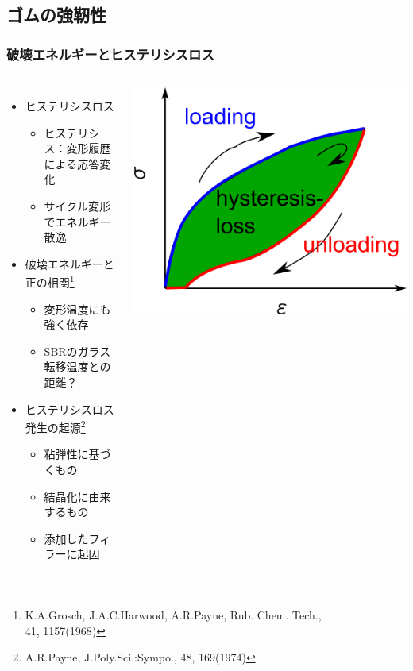 \documentclass[aspectratio=169,11pt, dvipdfmx]{beamer}
\begin{document}
\subsection{ゴムの強靭性}
\begin{frame}
	\frametitle{破壊エネルギーとヒステリシスロス}
	\vspace{-1mm}
			\begin{columns}[T, onlytextwidth]
					\begin{itemize}
						\item ヒステリシスロス
							\begin{itemize}
								\item ヒステリシス：変形履歴による応答変化
								\item サイクル変形でエネルギー散逸
							\end{itemize}
						\item 破壊エネルギーと\alert{正の相関}\footnote{
								\scriptsize{K.A.Grosch, J.A.C.Harwood, A.R.Payne, Rub. Chem. Tech., \\41, 1157(1968)}
							}
							\begin{itemize}
								\item \alert{変形温度}にも強く依存
								\item SBRのガラス転移温度との距離？
							\end{itemize}
						\item ヒステリシスロス発生の起源\footnote{
							\scriptsize{A.R.Payne, J.Poly.Sci.:Sympo., 48, 169(1974)}
						}
						\begin{itemize}
							\item \alert{粘弾性に基づくもの}
							\color{blue}
							\item 結晶化に由来するもの
							\item 添加したフィラーに起因
						\end{itemize}
					\end{itemize}
                    \centering
					\includegraphics[width=.8\textwidth]{hysteresis_curve.png}


\end{columns}
\end{frame}
\end{document}
